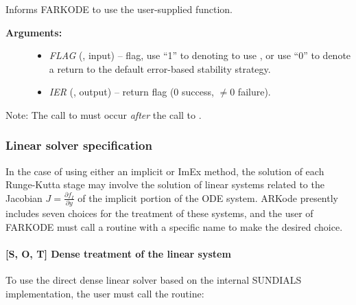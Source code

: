 \documentclass[letterpaper,10pt,english]{sphinxmanual}
\begin{document}
\begin{fulllineitems}
\label{f_interface/Usage:f/_/FARKEXPSTABSET}
Informs FARKODE to use the user-supplied {\hyperref[f_interface/Usage:f/_/FARKEXPSTAB]{}} function.
\begin{description}
\item[{\textbf{Arguments:}}] \leavevmode\begin{itemize}
\item {} 
\emph{FLAG} (, input) -- flag, use ``1'' to denoting to use
{\hyperref[f_interface/Usage:f/_/FARKEXPSTAB]{}}, or use ``0'' to denote a return to the
default error-based stability strategy.

\item {} 
\emph{IER} (, output) -- return flag (0 success, $\ne
0$ failure).

\end{itemize}

\end{description}

Note: The call to {\hyperref[f_interface/Usage:f/_/FARKEXPSTABSET]{}} must occur \emph{after} the call
to {\hyperref[f_interface/Usage:f/_/FARKMALLOC]{}}.

\end{fulllineitems}



\subsubsection{Linear solver specification}
\label{f_interface/Usage:finterface-linearsolver}\label{f_interface/Usage:linear-solver-specification}
In the case of using either an implicit or ImEx method, the solution
of each Runge-Kutta stage may involve the solution of linear systems
related to the Jacobian $J = \frac{\partial f_I}{\partial y}$ of
the implicit portion of the ODE system. ARKode presently includes
seven choices for the treatment of these systems, and the user of
FARKODE must call a routine with a specific name to make the
desired choice.


\paragraph{{[}\textbf{S}, \textbf{O}, \textbf{T}{]} Dense treatment of the linear system}
\label{f_interface/Usage:s-o-t-dense-treatment-of-the-linear-system}
To use the direct dense linear solver based on the internal SUNDIALS
implementation, the user must call the {\hyperref[f_interface/Usage:f/_/FARKDENSE]{}} routine:
\end{document}
